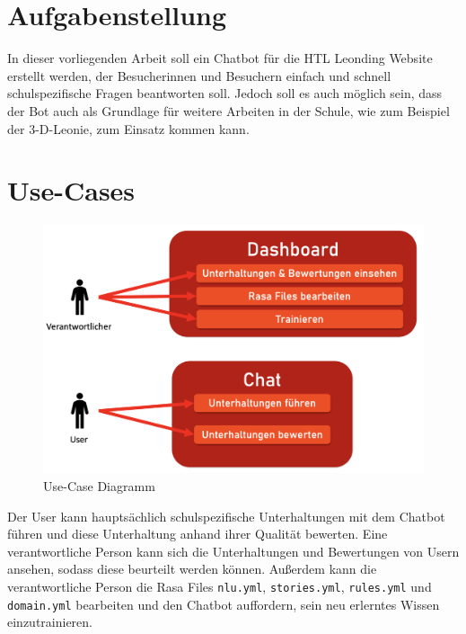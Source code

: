 \section{Aufgabenstellung}
In dieser vorliegenden Arbeit soll ein Chatbot für die HTL Leonding Website erstellt werden, der Besucherinnen und Besuchern einfach und schnell schulspezifische Fragen beantworten soll.
Jedoch soll es auch möglich sein, dass der Bot auch als Grundlage für weitere Arbeiten in der Schule, wie zum Beispiel der 3-D-Leonie, zum Einsatz kommen kann.

\section{Use-Cases}

\begin{figure}[hbt!]
    \centering
    \includegraphics[scale=0.5]{pics/usecase}
    \caption{Use-Case Diagramm}
    \label{fig:impl:usecase}
\end{figure}

Der User kann hauptsächlich schulspezifische Unterhaltungen mit dem Chatbot führen und diese Unterhaltung anhand ihrer Qualität bewerten.
Eine verantwortliche Person kann sich die Unterhaltungen und Bewertungen von Usern ansehen, sodass diese beurteilt werden können.
Außerdem kann die verantwortliche Person die Rasa Files \texttt{nlu.yml}, \texttt{stories.yml}, \texttt{rules.yml} und \texttt{domain.yml} bearbeiten und den Chatbot auffordern, sein neu erlerntes Wissen einzutrainieren.
